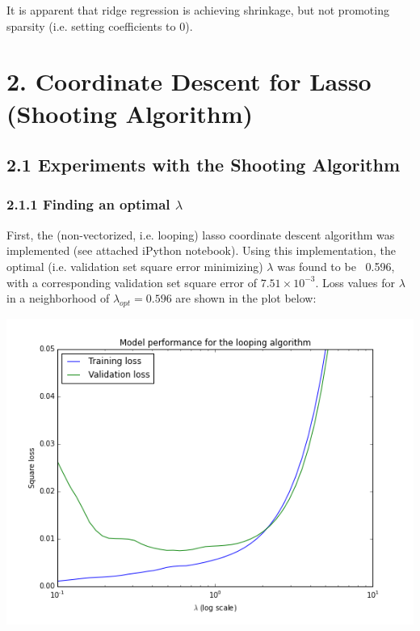 \documentclass[paper=a4, fontsize=11pt]{scrartcl} %
\numberwithin{equation}{section} %
\numberwithin{figure}{section} %
\numberwithin{table}{section} %
\begin{document}
It is apparent that ridge regression is achieving shrinkage, but not promoting sparsity (i.e. setting coefficients to 0).


\section*{2. Coordinate Descent for Lasso (Shooting Algorithm)}
\subsection*{2.1 Experiments with the Shooting Algorithm}
\subsubsection*{2.1.1 Finding an optimal $\lambda$}

First, the (non-vectorized, i.e. looping) lasso coordinate descent algorithm was implemented (see attached iPython notebook). Using this implementation, the optimal (i.e. validation set square error minimizing) $\lambda$ was found to be ~0.596, with a corresponding validation set square error of $7.51 \times 10^{-3}$. Loss values for $\lambda$ in a neighborhood of $\lambda_{opt} = 0.596$ are shown in the plot below:

\begin{center} \includegraphics[scale=0.65]{./../figures/2_1_looping.png} \end{center}
\end{document}
